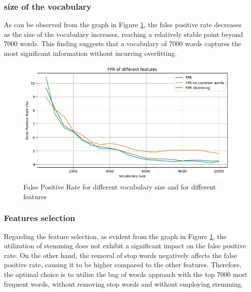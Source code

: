 \documentclass{class}
\begin{document}
\subsubsection*{size of the vocabulary}
As can be observed from the graph in Figure \ref{fig-3}, the false positive rate decreases as the size of the vocabulary increases,
reaching a relatively stable point beyond 7000 words.
This finding suggests that a vocabulary of 7000 words captures the most significant information without incurring overfitting.
\begin{figure}[h]
    \centering
    \includegraphics[width=0.7\columnwidth]{images/fpr_naive_voc_size_features_selection.png}
    \caption{False Positive Rate for different vocabulary size and for different features}
    \label{fig-3}
\end{figure}

\subsubsection*{Features selection}
Regarding the feature selection, as evident from the graph in Figure \ref{fig-3},
the utilization of stemming does not exhibit a significant impact on the false positive rate.
On the other hand, the removal of stop words negatively affects the false positive rate, causing it to be higher compared to the other features.
Therefore, the optimal choice is to utilize the bag of words approach with the top 7000 most frequent words,
without removing stop words and without employing stemming.
\end{document}
